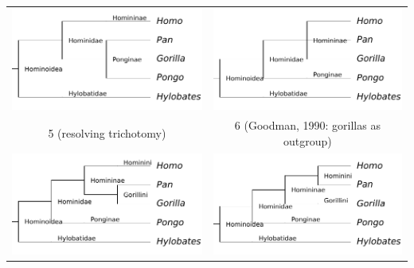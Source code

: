 \begin{samepage}
\begin{tabular}{cc}
\includegraphics[scale=0.7]{homino_2.pdf} & \includegraphics[scale=0.7]{homino_3.pdf} \\
5 (resolving trichotomy) & 6 (Goodman, 1990: gorillas as outgroup) \\
\includegraphics[scale=0.7]{homino_4.pdf} & \includegraphics[scale=0.7]{homino_5.pdf} \\

\end{tabular}
\end{samepage}
